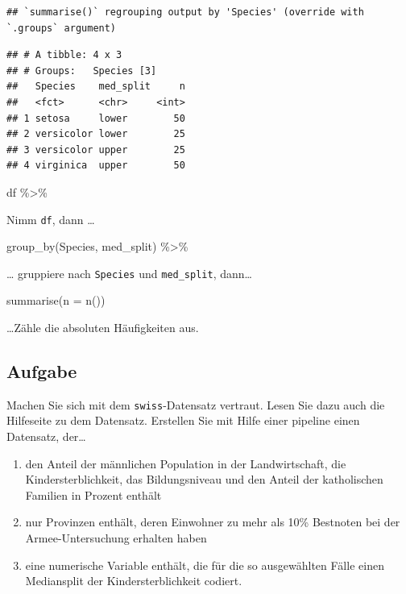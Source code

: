 \documentclass[
]{book}
\newenvironment{Shaded}{\begin{snugshade}}{\end{snugshade}}
\newcommand{\AttributeTok}[1]{\textcolor[rgb]{0.77,0.63,0.00}{#1}}
\newcommand{\FunctionTok}[1]{\textcolor[rgb]{0.00,0.00,0.00}{#1}}
\newcommand{\NormalTok}[1]{#1}
\newcommand{\SpecialCharTok}[1]{\textcolor[rgb]{0.00,0.00,0.00}{#1}}
\begin{document}
\begin{verbatim}
## `summarise()` regrouping output by 'Species' (override with `.groups` argument)
\end{verbatim}

\begin{verbatim}
## # A tibble: 4 x 3
## # Groups:   Species [3]
##   Species    med_split     n
##   <fct>      <chr>     <int>
## 1 setosa     lower        50
## 2 versicolor lower        25
## 3 versicolor upper        25
## 4 virginica  upper        50
\end{verbatim}

\begin{Shaded}
\begin{Highlighting}[]
\NormalTok{df }\SpecialCharTok{\%\textgreater{}\%} 
\end{Highlighting}
\end{Shaded}

Nimm \texttt{df}, dann \ldots{}

\begin{Shaded}
\begin{Highlighting}[]
  \FunctionTok{group\_by}\NormalTok{(Species, med\_split) }\SpecialCharTok{\%\textgreater{}\%} 
\end{Highlighting}
\end{Shaded}

\ldots{} gruppiere nach \texttt{Species} und \texttt{med\_split}, dann\ldots{}

\begin{Shaded}
\begin{Highlighting}[]
  \FunctionTok{summarise}\NormalTok{(}\AttributeTok{n =} \FunctionTok{n}\NormalTok{()) }
\end{Highlighting}
\end{Shaded}

\ldots Zähle die absoluten Häufigkeiten aus.

\hypertarget{aufgabe}{%
\subsection{Aufgabe}\label{aufgabe}}

Machen Sie sich mit dem \texttt{swiss}-Datensatz vertraut. Lesen Sie dazu auch die Hilfeseite zu dem Datensatz.
Erstellen Sie mit Hilfe einer pipeline einen Datensatz, der\ldots{}

\begin{enumerate}
\def\labelenumi{\arabic{enumi}.}
\item
  den Anteil der männlichen Population in der Landwirtschaft, die Kindersterblichkeit, das Bildungsniveau und den Anteil der katholischen Familien in Prozent enthält
\item
  nur Provinzen enthält, deren Einwohner zu mehr als 10\% Bestnoten bei der Armee-Untersuchung erhalten haben
\item
  eine numerische Variable enthält, die für die so ausgewählten Fälle einen Mediansplit der Kindersterblichkeit codiert.
\end{enumerate}
\end{document}
